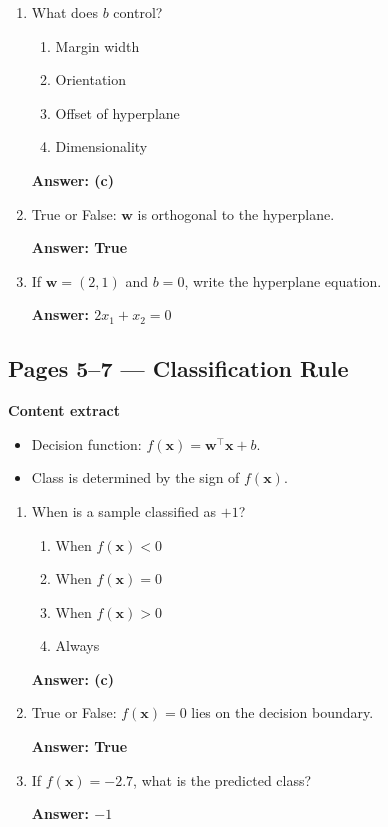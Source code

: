 \documentclass[12pt]{article}
\begin{document}
\begin{enumerate}
	\item What does $b$ control?
	\begin{enumerate}
		\item Margin width
		\item Orientation
		\item Offset of hyperplane
		\item Dimensionality
	\end{enumerate}
	\textbf{Answer: (c)}
	
	\item True or False: $\mathbf{w}$ is orthogonal to the hyperplane.
	
	\textbf{Answer: True}
	
	\item If $\mathbf{w} = (2,1)$ and $b=0$, write the hyperplane equation.
	
	\textbf{Answer: $2x_1 + x_2 = 0$}
\end{enumerate}


\subsection*{Pages 5--7 — Classification Rule}

\textbf{Content extract}
\begin{itemize}
	\item Decision function: $f(\mathbf{x}) = \mathbf{w}^\top \mathbf{x} + b$.
	\item Class is determined by the sign of $f(\mathbf{x})$.
\end{itemize}

\begin{enumerate}
	\item When is a sample classified as $+1$?
	\begin{enumerate}
		\item When $f(\mathbf{x}) < 0$
		\item When $f(\mathbf{x}) = 0$
		\item When $f(\mathbf{x}) > 0$
		\item Always
	\end{enumerate}
	\textbf{Answer: (c)}
	
	\item True or False: $f(\mathbf{x})=0$ lies on the decision boundary.
	
	\textbf{Answer: True}
	
	\item If $f(\mathbf{x})=-2.7$, what is the predicted class?
	
	\textbf{Answer: $-1$}
\end{enumerate}
\end{document}
